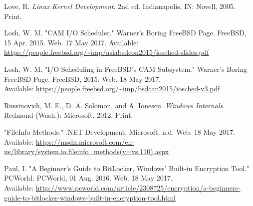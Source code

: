 \documentclass[10pt,draftclsnofoot,onecolumn,journal,compsoc]{IEEEtran}
\begin{document}
\begin{thebibliography}{18}

Love, R. \textit{Linux Kernel Development}. 2nd ed. Indianapolis, IN: Novell, 2005. Print.

Losh, W. M. "CAM I/O Scheduler." Warner's Boring FreeBSD Page. FreeBSD, 15 Apr. 2015. Web. 17 May 2017.
Available: \url{https://people.freebsd.org/~imp/asiabsdcon2015/iosched-slides.pdf}

Losh, W. M. "I/O Scheduling in FreeBSD’s CAM Subsystem." Warner's Boring FreeBSD Page. FreeBSD, 2015. Web. 18 May 2017. \\
Available: \url{https://people.freebsd.org/~imp/bsdcan2015/iosched-v3.pdf}

Russinovich, M. E., D. A. Solomon, and A. Ionescu. \textit{Windows Internals}. Redmond (Wash.): Microsoft, 2012. Print.

"FileInfo Methods." .NET Development. Microsoft, n.d. Web. 18 May 2017. \\
Available: \url{https://msdn.microsoft.com/en-us/library/system.io.fileinfo_methods(v=vs.110).aspx}

Paul, I. "A Beginner's Guide to BitLocker, Windows' Built-in Encryption Tool." PCWorld. PCWorld, 01 Aug. 2016. Web. 18 May 2017. \\
Available: \url{http://www.pcworld.com/article/2308725/encryption/a-beginners-guide-to-bitlocker-windows-built-in-encryption-tool.html}

\end{thebibliography}
\end{document}
